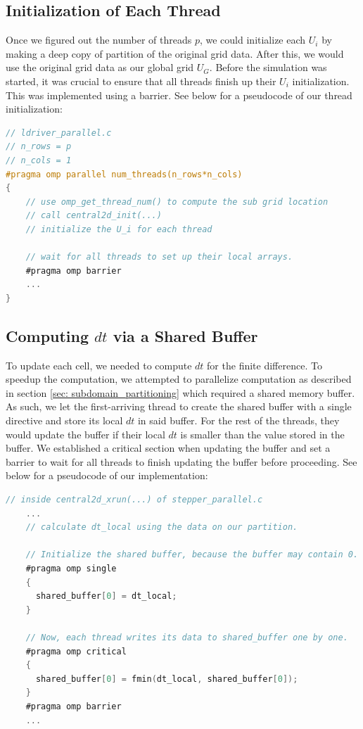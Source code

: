 \documentclass{article}
\begin{document}
\subsection{Initialization of Each Thread}
Once we figured out the number of threads $p$, we could initialize each $U_i$ by making a deep copy of partition of the original grid data. 
After this, we would use the original grid data as our global grid $U_G$. Before the simulation was started, it was crucial to ensure that all threads finish up their $U_i$ initialization.
This was implemented using a barrier. See below for a pseudocode of our thread initialization: 

\begin{lstlisting}[language=C]
// ldriver_parallel.c
// n_rows = p
// n_cols = 1
#pragma omp parallel num_threads(n_rows*n_cols)
{
    // use omp_get_thread_num() to compute the sub grid location
    // call central2d_init(...)
    // initialize the U_i for each thread

    // wait for all threads to set up their local arrays.
    #pragma omp barrier
    ...
}
\end{lstlisting}

\subsection{Computing $dt$ via a Shared Buffer}
To update each cell, we needed to compute $dt$ for the finite difference. To speedup the computation, 
we attempted to parallelize computation as described in section \ref{sec: subdomain_partitioning} which required a shared 
memory buffer. As such, we let the first-arriving thread to create the shared buffer with a single directive 
and store its local $dt$ in said buffer. For the rest of the threads, they would update the buffer if their local $dt$ is smaller than
the value stored in the buffer.  We established a critical section when updating the buffer and set a barrier to wait for all threads 
to finish updating the buffer before proceeding. See below for a pseudocode of our implementation: 

\begin{lstlisting}[language=C]
// inside central2d_xrun(...) of stepper_parallel.c
    ...
    // calculate dt_local using the data on our partition.

    // Initialize the shared buffer, because the buffer may contain 0.
    #pragma omp single
    {
      shared_buffer[0] = dt_local;
    }

    // Now, each thread writes its data to shared_buffer one by one.
    #pragma omp critical
    {
      shared_buffer[0] = fmin(dt_local, shared_buffer[0]);
    }
    #pragma omp barrier
    ...
\end{lstlisting}
\end{document}

